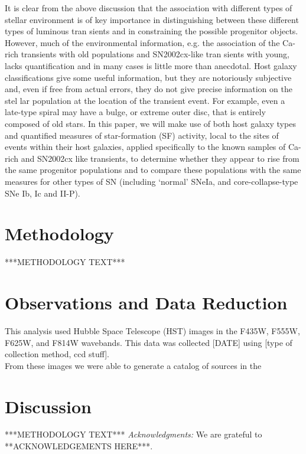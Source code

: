 \documentclass[preprint2]{aastex}
\begin{document}
It is clear from the above discussion that the association with
different types of stellar environment is of key importance in
distinguishing between these different types of luminous tran
sients and in constraining the possible progenitor objects. However,
much of the environmental information, e.g. the association of the
Ca-rich transients with old populations and SN2002cx-like tran
sients with young, lacks quantification and in many cases is little
more than anecdotal. Host galaxy classifications give some useful
information, but they are notoriously subjective and, even if free
from actual errors, they do not give precise information on the stel
lar population at the location of the transient event. For example,
even a late-type spiral may have a bulge, or extreme outer disc, that
is entirely composed of old stars. In this paper, we will make use
of both host galaxy types and quantified measures of star-formation
(SF) activity, local to the sites of events within their host galaxies,
applied specifically to the known samples of Ca-rich and SN2002cx
like transients, to determine whether they appear to rise from the
same progenitor populations and to compare these populations with
the same measures for other types of SN (including ‘normal’ SNeIa,
and core-collapse-type SNe Ib, Ic and II-P).
















\section{Methodology}

***METHODOLOGY TEXT***

\section{Observations and Data Reduction}

This analysis used Hubble Space Telescope (HST) images in the F435W, F555W, F625W,
 and F814W wavebands. This data was collected [DATE] using [type of collection
 method, ccd stuff]. \\
From these images we were able to generate a catalog of sources in the 

\section{Discussion}

***METHODOLOGY TEXT***
{\it Acknowledgments:} We are grateful to **ACKNOWLEDGEMENTS HERE***.

\end{document}
